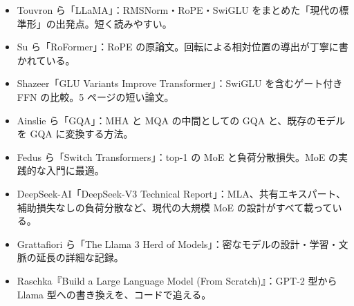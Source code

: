 \begin{itemize}
\item Touvron ら「LLaMA」\cite{touvron2023llama}：RMSNorm・RoPE・SwiGLU をまとめた「現代の標準形」の出発点。短く読みやすい。
\item Su ら「RoFormer」\cite{su2024roformer}：RoPE の原論文。回転による相対位置の導出が丁寧に書かれている。
\item Shazeer「GLU Variants Improve Transformer」\cite{shazeer2020glu}：SwiGLU を含むゲート付き FFN の比較。5 ページの短い論文。
\item Ainslie ら「GQA」\cite{ainslie2023gqa}：MHA と MQA の中間としての GQA と、既存のモデルを GQA に変換する方法。
\item Fedus ら「Switch Transformers」\cite{fedus2022switch}：top-1 の MoE と負荷分散損失。MoE の実践的な入門に最適。
\item DeepSeek-AI「DeepSeek-V3 Technical Report」\cite{liu2024deepseekv3}：MLA、共有エキスパート、補助損失なしの負荷分散など、現代の大規模 MoE の設計がすべて載っている。
\item Grattafiori ら「The Llama 3 Herd of Models」\cite{dubey2024llama3}：密なモデルの設計・学習・文脈の延長の詳細な記録。
\item Raschka『Build a Large Language Model (From Scratch)』\cite{raschka2024build}：GPT-2 型から Llama 型への書き換えを、コードで追える。
\end{itemize}

